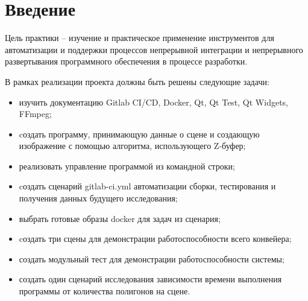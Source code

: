 \chapter*{Введение}

Цель практики -- изучение и практическое применение инструментов для автоматизации и поддержки процессов непрерывной интеграции и непрерывного развертывания программного обеспечения в процессе разработки.

В рамках реализации проекта должны быть решены следующие задачи:
\begin{itemize}
	\item изучить документацию Gitlab CI/CD, Docker, Qt, Qt Test, Qt Widgets, FFmpeg;
    \item cоздать программу, принимающую данные о сцене и создающую изображение с помощью алгоритма, использующего Z-буфер;
    \item реализовать управление программой из командной строки;
    \item cоздать сценарий gitlab-ci.yml автоматизации сборки, тестирования и получения
    данных будущего исследования; 
    \item выбрать готовые образы docker для задач из сценария;
    \item cоздать три сцены для демонстрации работоспособности всего конвейера;
    \item создать модульный тест для демонстрации работоспособности системы;
    \item создать один сценарий исследования зависимости времени выполнения программы от количества полигонов на сцене.
\end{itemize}


